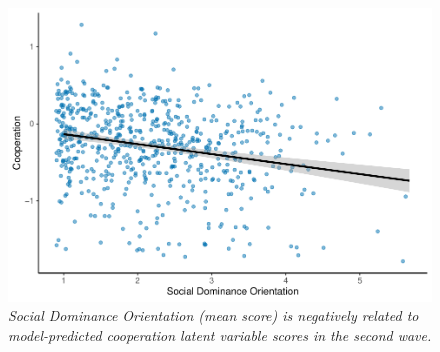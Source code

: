 \documentclass[
  man,floatsintext]{apa6}
\begin{document}
\newpage





\begin{figure}
\includegraphics[width=0.8\linewidth]{manuscript_files/figure-latex/sem1Plot-1} \caption{\emph{Social Dominance Orientation (mean score) is
negatively related to model-predicted cooperation latent variable scores in the
second wave.}}\label{fig:sem1Plot}
\end{figure}

\newpage
\end{document}

